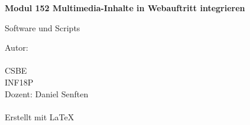 
\begin{titlepage}
    \begin{center}
        \vspace*{2.5cm}

        \Huge
        \textbf{Modul 152 Multimedia-Inhalte in Webauftritt integrieren}

        \vspace{0.5cm}
        \LARGE
        Software und Scripts

        \vfill


        \vspace{0.8cm}

        \Large
        Autor: \gitAuthorName\\
        \gitAuthorEmail\\
        CSBE\\
        INF18P\\
        Dozent: Daniel Senften\\
        \gitAuthorDate\\
        \small
        \vspace{1cm}
        Erstellt mit \LaTeX\\
        \vspace{1cm}
        \gitStyler
    \end{center}
\end{titlepage}